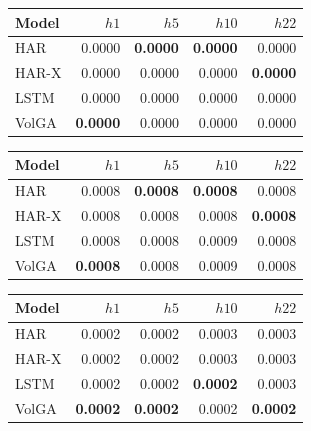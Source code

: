 

\begin{tabular}{lrrrr}
\toprule
Model & $h1$ & $h5$ & $h10$ & $h22$ \\
\midrule
HAR & 0.0000 & \textbf{0.0000} & \textbf{0.0000} & 0.0000 \\
HAR-X & 0.0000 & 0.0000 & 0.0000 & \textbf{0.0000} \\
LSTM & 0.0000 & 0.0000 & 0.0000 & 0.0000 \\
VolGA & \textbf{0.0000} & 0.0000 & 0.0000 & 0.0000 \\
\bottomrule
\end{tabular}

\begin{tabular}{lrrrr}
\toprule
Model & $h1$ & $h5$ & $h10$ & $h22$ \\
\midrule
HAR & 0.0008 & \textbf{0.0008} & \textbf{0.0008} & 0.0008 \\
HAR-X & 0.0008 & 0.0008 & 0.0008 & \textbf{0.0008} \\
LSTM & 0.0008 & 0.0008 & 0.0009 & 0.0008 \\
VolGA & \textbf{0.0008} & 0.0008 & 0.0009 & 0.0008 \\
\bottomrule
\end{tabular}

\begin{tabular}{lrrrr}
\toprule
Model & $h1$ & $h5$ & $h10$ & $h22$ \\
\midrule
HAR & 0.0002 & 0.0002 & 0.0003 & 0.0003 \\
HAR-X & 0.0002 & 0.0002 & 0.0003 & 0.0003 \\
LSTM & 0.0002 & 0.0002 & \textbf{0.0002} & 0.0003 \\
VolGA & \textbf{0.0002} & \textbf{0.0002} & 0.0002 & \textbf{0.0002} \\
\bottomrule
\end{tabular}

